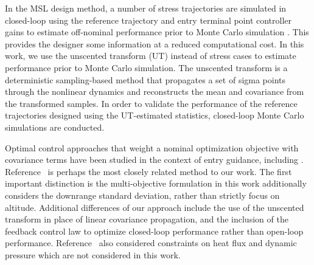 \documentclass[journal ]{new-aiaa}
\begin{document}
In the MSL design method, a number of stress trajectories are simulated in closed-loop using the reference trajectory and entry terminal point controller gains to estimate off-nominal performance prior to Monte Carlo simulation \cite{MSL_EDL2}. This provides the designer some information at a reduced computational cost. In this work, we use the unscented transform (UT) \cite{UT1997} instead of stress cases to estimate performance prior to Monte Carlo simulation. The unscented transform is a deterministic sampling-based method that propagates a set of sigma points through the nonlinear dynamics and reconstructs the mean and covariance from the transformed samples. In order to validate the performance of the reference trajectories designed using the UT-estimated statistics, closed-loop Monte Carlo simulations are conducted.

Optimal control approaches that weight a nominal optimization objective with covariance terms have been studied in the context of entry guidance, including \cite{AltitudeUnderUncertainty, MarsEntryDesensitized, EntryOUUThesis1, EntryOUUThesis2, EntryOUU}.
Reference~\cite{AltitudeUnderUncertainty} is perhaps the most closely related method to our work. The first important distinction is the multi-objective formulation in this work additionally considers the downrange standard deviation, rather than strictly focus on altitude. Additional differences of our approach include the use of the unscented transform in place of linear covariance propagation, and the inclusion of the feedback control law to optimize closed-loop performance rather than open-loop performance. Reference~\cite{AltitudeUnderUncertainty} also considered constraints on heat flux and dynamic pressure which are not considered in this work. 
\end{document}
